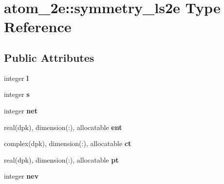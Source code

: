 \hypertarget{structatom__2e_1_1symmetry__ls2e}{}\section{atom\+\_\+2e\+:\+:symmetry\+\_\+ls2e Type Reference}
\label{structatom__2e_1_1symmetry__ls2e}
\subsection*{Public Attributes}
\begin{DoxyCompactItemize}
\item 
integer {\bfseries l}\hypertarget{structatom__2e_1_1symmetry__ls2e_af85540a511dae3037d15dbd0127e8183}{}\label{structatom__2e_1_1symmetry__ls2e_af85540a511dae3037d15dbd0127e8183}

\item 
integer {\bfseries s}\hypertarget{structatom__2e_1_1symmetry__ls2e_a2463c2c330c3b6af7df3a85601145799}{}\label{structatom__2e_1_1symmetry__ls2e_a2463c2c330c3b6af7df3a85601145799}

\item 
integer {\bfseries net}\hypertarget{structatom__2e_1_1symmetry__ls2e_a8e46c555af5834484c2ecd24b04eecec}{}\label{structatom__2e_1_1symmetry__ls2e_a8e46c555af5834484c2ecd24b04eecec}

\item 
real(dpk), dimension(\+:), allocatable {\bfseries ent}\hypertarget{structatom__2e_1_1symmetry__ls2e_aaa549ad4069108a812fbbc512763e865}{}\label{structatom__2e_1_1symmetry__ls2e_aaa549ad4069108a812fbbc512763e865}

\item 
complex(dpk), dimension(\+:), allocatable {\bfseries ct}\hypertarget{structatom__2e_1_1symmetry__ls2e_afb2ca985289c5f28b81cd0dfaf05c82c}{}\label{structatom__2e_1_1symmetry__ls2e_afb2ca985289c5f28b81cd0dfaf05c82c}

\item 
real(dpk), dimension(\+:), allocatable {\bfseries pt}\hypertarget{structatom__2e_1_1symmetry__ls2e_ac6c30376f26485ff9fa89b9a1813c1b6}{}\label{structatom__2e_1_1symmetry__ls2e_ac6c30376f26485ff9fa89b9a1813c1b6}

\item 
integer {\bfseries nev}\hypertarget{structatom__2e_1_1symmetry__ls2e_af97967d9fb6c7c2b1cde06245daa03e4}{}\label{structatom__2e_1_1symmetry__ls2e_af97967d9fb6c7c2b1cde06245daa03e4}


\end{DoxyCompactItemize}
